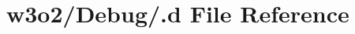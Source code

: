 \hypertarget{w3o2_2_debug_2_8d}{}\section{w3o2/\+Debug/.d File Reference}
\label{w3o2_2_debug_2_8d}
